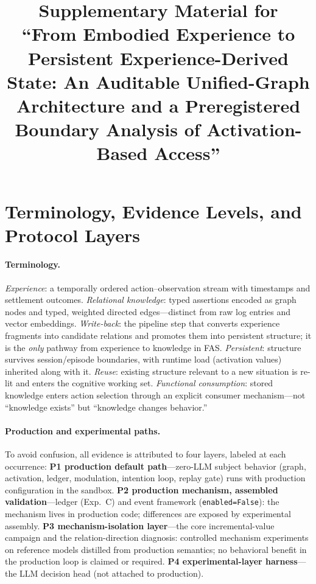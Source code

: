 \documentclass[10pt]{article}
\title{\bfseries Supplementary Material for\\
``From Embodied Experience to Persistent Experience-Derived State: An Auditable Unified-Graph Architecture and a Preregistered Boundary Analysis of Activation-Based Access''}
\author{}
\date{}
\begin{document}
\long\gdef\theabstract{}
\maketitle

\section{Terminology, Evidence Levels, and Protocol Layers}
\label{s1:term}

\paragraph{Terminology.} \emph{Experience}: a temporally ordered action--observation stream with timestamps and settlement outcomes. \emph{Relational knowledge}: typed assertions encoded as graph nodes and typed, weighted directed edges---distinct from raw log entries and vector embeddings. \emph{Write-back}: the pipeline step that converts experience fragments into candidate relations and promotes them into persistent structure; it is the \emph{only} pathway from experience to knowledge in FAS. \emph{Persistent}: structure survives session/episode boundaries, with runtime load (activation values) inherited along with it. \emph{Reuse}: existing structure relevant to a new situation is re-lit and enters the cognitive working set. \emph{Functional consumption}: stored knowledge enters action selection through an explicit consumer mechanism---not ``knowledge exists'' but ``knowledge changes behavior.''

\paragraph{Production and experimental paths.} To avoid confusion, all evidence is attributed to four layers, labeled at each occurrence: \textbf{P1 production default path}---zero-LLM subject behavior (graph, activation, ledger, modulation, intention loop, replay gate) runs with production configuration in the sandbox. \textbf{P2 production mechanism, assembled validation}---ledger (Exp.~C) and event framework (\texttt{enabled=False}): the mechanism lives in production code; differences are exposed by experimental assembly. \textbf{P3 mechanism-isolation layer}---the core incremental-value campaign and the relation-direction diagnosis: controlled mechanism experiments on reference models distilled from production semantics; no behavioral benefit in the production loop is claimed or required. \textbf{P4 experimental-layer harness}---the LLM decision head (not attached to production).
\end{document}
